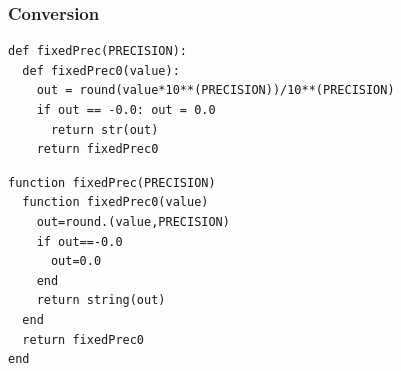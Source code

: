 \documentclass[a4paper,12pt]{article}
\begin{document}
\subsubsection{Conversion}
\noindent {}
\begin{multicols}{2}
\noindent {}
\begin{Verbatim}[fontsize=\scriptsize]
def fixedPrec(PRECISION):
  def fixedPrec0(value):
    out = round(value*10**(PRECISION))/10**(PRECISION)
    if out == -0.0: out = 0.0
      return str(out)
    return fixedPrec0 
\end{Verbatim}
\columnbreak
{}
\begin{Verbatim}[fontsize=\scriptsize]
function fixedPrec(PRECISION)
  function fixedPrec0(value) 
    out=round.(value,PRECISION)
    if out==-0.0
      out=0.0
    end
    return string(out)
  end
  return fixedPrec0
end
\end{Verbatim}
\end{multicols}
\end{document}
